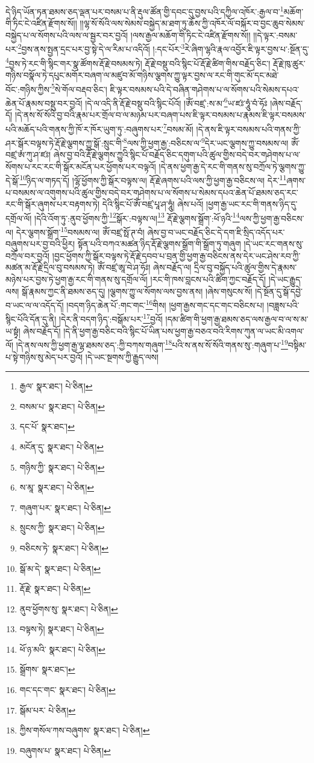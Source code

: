དེ་ཉིད་ཡོན་ཏན་ཐམས་ཅད་ལྡན་པར་བསམ་པ་ནི་རྡུལ་ཚོན་གྱི་དབང་དུ་བྱས་པའི་དཀྱིལ་འཁོར་:རྒྱལ་བ་\footnote{རྒྱལ་  སྣར་ཐང་།  པེ་ཅིན། }མཆོག་གི་ཏིང་ངེ་འཛིན་རྫོགས་སོ།། །།ལྷ་སོ་སོའི་ལས་སེམས་བསྐྱེད་མ་ཐག་ཏུ་ཆོས་ཀྱི་འཁོར་ལོ་བསྐོར་བ་བྱང་ཆུབ་སེམས་བསྐྱེད་པ་ལ་སོགས་པའི་ལས་ལ་སྦྱར་བར་བྱའོ། །ལས་རྒྱལ་མཆོག་གི་ཏིང་ངེ་འཛིན་རྫོགས་སོ།། །།དེ་ལྟར་:བསམ་པར་\footnote{བསམ་པ་  སྣར་ཐང་།  པེ་ཅིན། }བྱས་ནས་སྤྱན་དྲང་པར་བྱ་སྟེ་དེ་ལ་རིམ་པ་འདིའོ། །:དང་པོར་\footnote{དང་པོ་  སྣར་ཐང་། }རེ་ཞིག་ལྷའི་རྣལ་འབྱོར་ཇི་ལྟར་བྱས་པ་:སྔོན་དུ་\footnote{མངོན་དུ་  སྣར་ཐང་།  པེ་ཅིན། }བྱས་ཏེ་རང་གི་སྙིང་གར་སྣ་ཚོགས་རྡོ་རྗེ་བསམས་ཏེ། རྡོ་རྗེ་བསྡུ་བའི་སྙིང་པོ་རྡོ་རྗེ་ཚིག་གིས་བརྗོད་ཅིང་། རྡོ་རྗེ་ཁུ་ཚུར་གཉིས་བསྣོལ་ཏེ་དཔུང་མགོར་བཞག་ལ་མཛུབ་མོ་གཉིས་ལྕགས་ཀྱུ་ལྟར་བྱས་ལ་རང་གི་གུང་མོ་དང་མཐེ་བོང་:གཉིས་ཀྱིས་\footnote{གཉིས་ཀྱི་  སྣར་ཐང་།  པེ་ཅིན། }སེ་གོལ་བརྡབ་ཅིང་། ཇི་ལྟར་བསམས་པའི་དེ་བཞིན་གཤེགས་པ་ལ་སོགས་པའི་སེམས་དཔའ་ཆེན་པོ་རྣམས་བསྡུ་བར་བྱའོ། །དེ་ལ་འདི་ནི་རྡོ་རྗེ་བསྡུ་བའི་སྙིང་པོའོ། །ཨོཾ་བཛྲ་:ས་མ་\footnote{ས་མཱ་  སྣར་ཐང་།  པེ་ཅིན། }ཡ་ཛཿ་ཧཱུཾ་བཾ་ཧོཿ །ཞེས་བརྗོད་དོ། །དེ་ནས་སོ་སོའི་བྱ་བའི་རྣམ་པར་གྲོལ་བ་ལ་མཉམ་པར་བཞག་པས་ཇི་ལྟར་བསམས་པ་རྣམས་ཇི་ལྟར་བསམས་པའི་མཆོད་པའི་གནས་ཀྱི་ཁོ་ར་ཁོར་ཡུག་ཏུ་:བཞུགས་པར་\footnote{གཞུག་པར་  སྣར་ཐང་།  པེ་ཅིན། }བསམ་མོ། །དེ་ནས་ཇི་ལྟར་བསམས་པའི་གནས་ཀྱི་ཤར་སྒོར་བལྟས་ཏེ་རྡོ་རྗེ་ལྕགས་ཀྱུ་སྒོ་:སྲུང་གི་\footnote{སྲུངས་ཀྱི་  སྣར་ཐང་།  པེ་ཅིན། }ལས་ཀྱི་ཕྱག་རྒྱ་:བཅིངས་ལ་\footnote{བཅིངས་ཏེ་  སྣར་ཐང་།  པེ་ཅིན། }དེར་ཡང་ལྕགས་ཀྱུ་བསམས་ལ། ཨོཾ་བཛྲ་ཨཾ་ཀུ་ཤ་ཛཿ། ཞེས་བྱ་བའི་རྡོ་རྗེ་ལྕགས་ཀྱུའི་སྙིང་པོ་བརྗོད་ཅིང་དགུག་པའི་ཚུལ་གྱིས་བདེ་བར་གཤེགས་པ་ལ་སོགས་པ་རང་རང་གི་སྒོར་མངོན་པར་ཕྱོགས་པར་བལྟའོ། །དེ་ནས་ཕྱག་རྒྱ་དེ་རང་གི་གནས་སུ་བཀྲོལ་ཏེ་ལྕགས་ཀྱུ་དེ་སྒོ་\footnote{སྒོ་མ་དེ་  སྣར་ཐང་།  པེ་ཅིན། }ཉིད་ལ་གཏད་དོ། །ལྷོ་ཕྱོགས་ཀྱི་སྒོར་བལྟས་ལ། རྡོ་རྗེ་ཞགས་པའི་ལས་ཀྱི་ཕྱག་རྒྱ་བཅིངས་ལ། དེར་\footnote{རྡོ་རྗེ་  སྣར་ཐང་།  པེ་ཅིན། }ཞགས་པ་བསམས་ལ་འགུགས་པའི་ཚུལ་གྱིས་བདེ་བར་གཤེགས་པ་ལ་སོགས་པ་སེམས་དཔའ་ཆེན་པོ་ཐམས་ཅད་རང་རང་གི་སྒོར་ཞུགས་པར་བརྟགས་ཏེ། དེའི་སྙིང་པོ་ཨོཾ་བཛྲ་པཱ་ཤ་ཧཱུཾ། ཞེས་པའོ། །ཕྱག་རྒྱ་ཡང་རང་གི་གནས་ཉིད་དུ་དགྲོལ་ལོ། །དེའི་འོག་ཏུ་:ནུབ་ཕྱོགས་ཀྱི་\footnote{ནུབ་ཕྱོགས་སུ་  སྣར་ཐང་།  པེ་ཅིན། }སྒོར་:བལྟས་ལ།\footnote{བལྟས་ཏེ།  སྣར་ཐང་།  པེ་ཅིན། } རྡོ་རྗེ་ལྕགས་སྒྲོག་:ཕོ་ཉའི་\footnote{ཕོ་ཉ་མའི་  སྣར་ཐང་།  པེ་ཅིན། }ལས་ཀྱི་ཕྱག་རྒྱ་བཅིངས་ལ། དེར་ལྕགས་སྒྲོག་\footnote{སྒྲོགས་  སྣར་ཐང་། }བསམས་ལ། ཨོཾ་བཛྲ་སྥོ་ཊ་བཾ། ཞེས་བྱ་བ་ཡང་བརྗོད་ཅིང་དེ་དག་ཇི་སྲིད་འདོད་པར་བཞུགས་པར་བྱ་བའི་ཕྱིར། སྟོན་པའི་བཀའ་མཚན་ཉིད་རྡོ་རྗེ་ལྕགས་སྒྲོག་གི་སྒྲོག་ཏུ་གཞུག །དེ་ཡང་རང་གནས་སུ་བཀྲོལ་བར་བྱའོ། །བྱང་ཕྱོགས་ཀྱི་སྒོར་བལྟས་ཏེ་རྡོ་རྗེ་དབབ་པ་བྲན་གྱི་ཕྱག་རྒྱ་བཅིངས་ནས་དེར་ཡང་ཤེས་རབ་ཀྱི་མཚན་མ་རྡོ་རྗེ་དྲིལ་བུ་བསམས་ཏེ། ཨོཾ་བཛྲ་ཨཱ་བེ་ཤ་ཧོཿ། ཞེས་བརྗོད་ལ། དྲིལ་བུ་བསྐྱོད་པའི་ཚུལ་གྱིས་དེ་རྣམས་མཉེས་པར་བྱས་ཏེ་ཕྱག་རྒྱ་རང་གི་གནས་སུ་དགྲོལ་ལོ། །རང་གི་ཁས་བླངས་པའི་ཚིག་ཀྱང་བརྗོད་དོ། །དེ་ཡང་རྒྱུད་ལས། སྒོ་རྣམས་ཀྱང་ནི་ཐམས་ཅད་དུ། །ལྕགས་ཀྱུ་ལ་སོགས་ལས་བྱས་ནས། །ཞེས་གསུངས་སོ། །དེ་སྔོན་དུ་སྒོ་དབྱེ་བ་ཡང་ལ་ལ་འདོད་དོ། །བདག་ཉིད་ཆེན་པོ་:གང་གང་\footnote{གང་དང་གང་  སྣར་ཐང་།  པེ་ཅིན། }གིས། །ཕྱག་རྒྱས་གང་དང་གང་བཅིངས་པ། །བཟླས་པའི་སྙིང་པོའི་དོན་དུ་ནི། །དེར་ནི་བདག་ཉིད་:བསྒོམ་པར་\footnote{སྒོམ་པར་  པེ་ཅིན། }བྱའོ། །དམ་ཚིག་གི་ཕྱག་རྒྱ་ཐམས་ཅད་ལས་རྒྱལ་བ་ལ་ས་མ་ཡ་སྟྭཾ། ཞེས་བརྗོད་དོ། །དེ་ནི་ཕྱག་རྒྱ་བཅིང་བའི་སྙིང་པོ་ཡིན་པས་ཕྱག་རྒྱ་བཅའ་བའི་རིགས་ཀུན་ལ་ཡང་མི་འགལ་ལོ། །དེ་ནས་ལས་ཀྱི་ཕྱག་རྒྱ་ལྷ་ཐམས་ཅད་:ཀྱི་བཀས་གཞུག་\footnote{ཀྱིས་གསོལ་ཀས་བཞུགས་  སྣར་ཐང་།  པེ་ཅིན། }པའི་ས་ནས་སོ་སོའི་གནས་སུ་:གཞུག་པ་\footnote{བཞུགས་པ་  སྣར་ཐང་།  པེ་ཅིན། }བསྟིམ་པ་སྟེ་གཉིས་སུ་མེད་པར་བྱའོ། །དེ་ཡང་སྔགས་ཀྱི་རྒྱུད་ལས། 